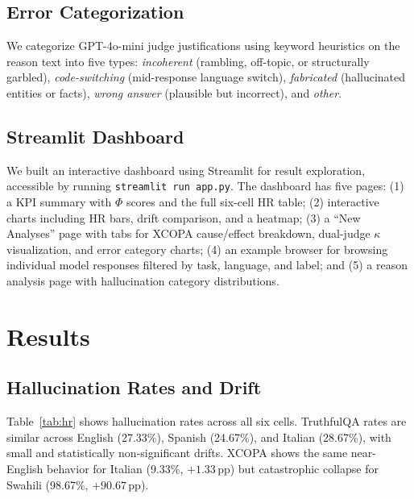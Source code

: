 \documentclass[11pt]{article}
\begin{document}
\subsection{Error Categorization}

We categorize GPT-4o-mini judge justifications using keyword heuristics on the
reason text into five types: \textit{incoherent} (rambling, off-topic, or
structurally garbled), \textit{code-switching} (mid-response language switch),
\textit{fabricated} (hallucinated entities or facts), \textit{wrong answer}
(plausible but incorrect), and \textit{other}.

\subsection{Streamlit Dashboard}

We built an interactive dashboard using Streamlit for result exploration,
accessible by running \texttt{streamlit run app.py}. The dashboard has five
pages: (1) a KPI summary with $\Phi$ scores and the full six-cell HR table;
(2) interactive charts including HR bars, drift comparison, and a heatmap;
(3) a ``New Analyses'' page with tabs for XCOPA cause/effect breakdown,
dual-judge $\kappa$ visualization, and error category charts; (4) an example browser
for browsing individual model responses filtered by task, language, and label;
and (5) a reason analysis page with hallucination category distributions.

\section{Results}

\subsection{Hallucination Rates and Drift}

Table~\ref{tab:hr} shows hallucination rates across all six cells. TruthfulQA
rates are similar across English (27.33\%), Spanish (24.67\%), and Italian
(28.67\%), with small and statistically non-significant drifts. XCOPA shows the
same near-English behavior for Italian (9.33\%, $+1.33$\,pp) but catastrophic
collapse for Swahili (98.67\%, $+90.67$\,pp).
\end{document}
